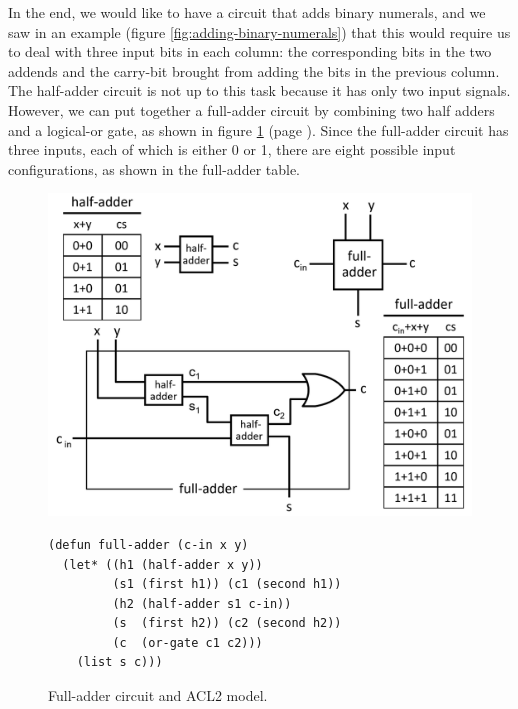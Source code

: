 In the end, we would like to have a circuit
that adds binary numerals,
and we saw in an example (figure \ref{fig:adding-binary-numerals})
that this would require us to deal with three input bits
in each column:
the corresponding bits in the two addends
and the carry-bit brought from adding
the bits in the previous column.
The half-adder circuit is not up to this task
because it has only two input signals.
However, we can put together a full-adder circuit
by combining two half adders and a logical-or gate,
as shown in figure \ref{fig:full-adder}
(page \pageref{fig:full-adder}).
Since the full-adder circuit has three inputs,
each of which is either 0 or 1,
there are eight possible input configurations,
as shown in the full-adder table.

\begin{figure}
\begin{center}
\includegraphics[scale=1]{images-cmyk/full-adder}
\begin{code}
\begin{verbatim}
(defun full-adder (c-in x y)
  (let* ((h1 (half-adder x y))
         (s1 (first h1)) (c1 (second h1))
         (h2 (half-adder s1 c-in))
         (s  (first h2)) (c2 (second h2))
         (c  (or-gate c1 c2)))
    (list s c)))
\end{verbatim}
\end{code}
\end{center}
\caption{Full-adder circuit and ACL2 model.}
\label{fig:full-adder}
\end{figure}


